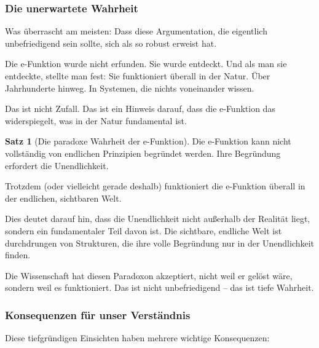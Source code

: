 \documentclass[a4paper, 12pt, twoside, openright]{report}
\theoremstyle{definition}
\theoremstyle{definition}
\newtheorem{satz}{Satz}[chapter]
\begin{document}
\subsubsection*{Die unerwartete Wahrheit}

Was überrascht am meisten: Dass diese Argumentation, die eigentlich unbefriedigend sein sollte, sich als so robust erweist hat. 

Die e-Funktion wurde nicht erfunden. Sie wurde entdeckt. Und als man sie entdeckte, stellte man fest: Sie funktioniert überall in der Natur. Über Jahrhunderte hinweg. In Systemen, die nichts voneinander wissen. 

Das ist nicht Zufall. Das ist ein Hinweis darauf, dass die e-Funktion das widerspiegelt, was in der Natur fundamental ist.

\begin{satz}[Die paradoxe Wahrheit der e-Funktion]
	Die e-Funktion kann nicht vollständig von endlichen Prinzipien begründet werden. Ihre Begründung erfordert die Unendlichkeit.
	
	Trotzdem (oder vielleicht gerade deshalb) funktioniert die e-Funktion überall in der endlichen, sichtbaren Welt.
	
	Dies deutet darauf hin, dass die Unendlichkeit nicht außerhalb der Realität liegt, sondern ein fundamentaler Teil davon ist. Die sichtbare, endliche Welt ist durchdrungen von Strukturen, die ihre volle Begründung nur in der Unendlichkeit finden.
	
	Die Wissenschaft hat diesen Paradoxon akzeptiert, nicht weil er gelöst wäre, sondern weil es funktioniert. Das ist nicht unbefriedigend -- das ist tiefe Wahrheit.
\end{satz}

\subsubsection*{Konsequenzen für unser Verständnis}

Diese tiefgründigen Einsichten haben mehrere wichtige Konsequenzen:
\end{document}
